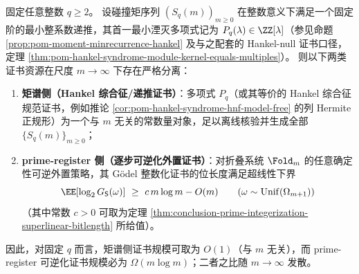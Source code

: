 \begin{theorem}\label{thm:pom-macro-moment-vs-micro-prime-register-certificate-separation}
固定任意整数 \(q\ge 2\)。
设碰撞矩序列 \((S_q(m))_{m\ge 0}\) 在整数意义下满足一个固定阶的最小整系数递推，其首一最小湮灭多项式记为 \(P_q(\lambda)\in\ZZ[\lambda]\)（参见命题 \ref{prop:pom-moment-minrecurrence-hankel} 及与之配套的 Hankel-null 证书口径，定理 \ref{thm:pom-hankel-syndrome-module-kernel-equals-multiples}）。
则以下两类证书资源在尺度 \(m\to\infty\) 下存在严格分离：
\begin{enumerate}
  \item \textbf{矩谱侧（Hankel 综合征/递推证书）}：多项式 \(P_q\)（或其等价的 Hankel 综合征规范证书，例如推论 \ref{cor:pom-hankel-syndrome-hnf-model-free} 的列 Hermite 正规形）为一个与 \(m\) 无关的常数量对象，足以离线核验并生成全部 \(\{S_q(m)\}_{m\ge 0}\)；
  \item \textbf{prime-register 侧（逐步可逆化外置证书）}：对折叠系统 \(\Fold_m\) 的任意确定性可逆外置策略，其 Gödel 整数化证书的位长度满足超线性下界
  \[
  \EE[\log_2 G_{\mathsf S}(\omega)]\ \ge\ c\,m\log m-O(m)
  \qquad(\omega\sim\mathrm{Unif}(\Omega_{m+1}))
  \]
  （其中常数 \(c>0\) 可取为定理 \ref{thm:conclusion-prime-integerization-superlinear-bitlength} 所给值）。
\end{enumerate}
因此，对固定 \(q\) 而言，矩谱侧证书规模可取为 \(O(1)\)（与 \(m\) 无关），而 prime-register 可逆化证书规模必为 \(\Omega(m\log m)\)；二者之比随 \(m\to\infty\) 发散。
\end{theorem}
